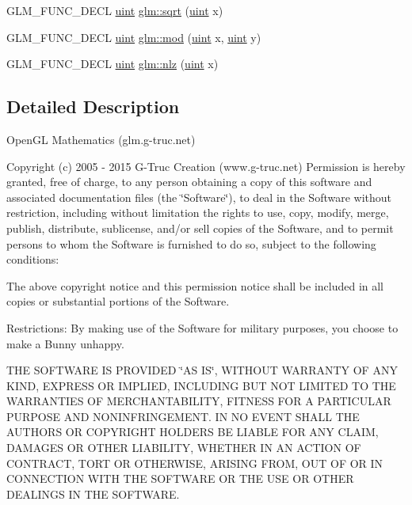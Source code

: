 \begin{DoxyCompactItemize}
\item 
G\+L\+M\+\_\+\+F\+U\+N\+C\+\_\+\+D\+E\+C\+L \hyperlink{stb__image_8c_a91ad9478d81a7aaf2593e8d9c3d06a14}{uint} \hyperlink{group__gtx__integer_ga457e9efca8339bf918d319e9c55f7c8f}{glm\+::sqrt} (\hyperlink{stb__image_8c_a91ad9478d81a7aaf2593e8d9c3d06a14}{uint} x)
\item 
G\+L\+M\+\_\+\+F\+U\+N\+C\+\_\+\+D\+E\+C\+L \hyperlink{stb__image_8c_a91ad9478d81a7aaf2593e8d9c3d06a14}{uint} \hyperlink{group__gtx__integer_gab8f9ec0ca93ca90669434224818f0750}{glm\+::mod} (\hyperlink{stb__image_8c_a91ad9478d81a7aaf2593e8d9c3d06a14}{uint} x, \hyperlink{stb__image_8c_a91ad9478d81a7aaf2593e8d9c3d06a14}{uint} y)
\item 
G\+L\+M\+\_\+\+F\+U\+N\+C\+\_\+\+D\+E\+C\+L \hyperlink{stb__image_8c_a91ad9478d81a7aaf2593e8d9c3d06a14}{uint} \hyperlink{group__gtx__integer_gacbe62fd2384464c16ea30ecc4defc11c}{glm\+::nlz} (\hyperlink{stb__image_8c_a91ad9478d81a7aaf2593e8d9c3d06a14}{uint} x)
\end{DoxyCompactItemize}


\subsection{Detailed Description}
Open\+G\+L Mathematics (glm.\+g-\/truc.\+net)

Copyright (c) 2005 -\/ 2015 G-\/\+Truc Creation (www.\+g-\/truc.\+net) Permission is hereby granted, free of charge, to any person obtaining a copy of this software and associated documentation files (the \char`\"{}\+Software\char`\"{}), to deal in the Software without restriction, including without limitation the rights to use, copy, modify, merge, publish, distribute, sublicense, and/or sell copies of the Software, and to permit persons to whom the Software is furnished to do so, subject to the following conditions\+:

The above copyright notice and this permission notice shall be included in all copies or substantial portions of the Software.

Restrictions\+: By making use of the Software for military purposes, you choose to make a Bunny unhappy.

T\+H\+E S\+O\+F\+T\+W\+A\+R\+E I\+S P\+R\+O\+V\+I\+D\+E\+D \char`\"{}\+A\+S I\+S\char`\"{}, W\+I\+T\+H\+O\+U\+T W\+A\+R\+R\+A\+N\+T\+Y O\+F A\+N\+Y K\+I\+N\+D, E\+X\+P\+R\+E\+S\+S O\+R I\+M\+P\+L\+I\+E\+D, I\+N\+C\+L\+U\+D\+I\+N\+G B\+U\+T N\+O\+T L\+I\+M\+I\+T\+E\+D T\+O T\+H\+E W\+A\+R\+R\+A\+N\+T\+I\+E\+S O\+F M\+E\+R\+C\+H\+A\+N\+T\+A\+B\+I\+L\+I\+T\+Y, F\+I\+T\+N\+E\+S\+S F\+O\+R A P\+A\+R\+T\+I\+C\+U\+L\+A\+R P\+U\+R\+P\+O\+S\+E A\+N\+D N\+O\+N\+I\+N\+F\+R\+I\+N\+G\+E\+M\+E\+N\+T. I\+N N\+O E\+V\+E\+N\+T S\+H\+A\+L\+L T\+H\+E A\+U\+T\+H\+O\+R\+S O\+R C\+O\+P\+Y\+R\+I\+G\+H\+T H\+O\+L\+D\+E\+R\+S B\+E L\+I\+A\+B\+L\+E F\+O\+R A\+N\+Y C\+L\+A\+I\+M, D\+A\+M\+A\+G\+E\+S O\+R O\+T\+H\+E\+R L\+I\+A\+B\+I\+L\+I\+T\+Y, W\+H\+E\+T\+H\+E\+R I\+N A\+N A\+C\+T\+I\+O\+N O\+F C\+O\+N\+T\+R\+A\+C\+T, T\+O\+R\+T O\+R O\+T\+H\+E\+R\+W\+I\+S\+E, A\+R\+I\+S\+I\+N\+G F\+R\+O\+M, O\+U\+T O\+F O\+R I\+N C\+O\+N\+N\+E\+C\+T\+I\+O\+N W\+I\+T\+H T\+H\+E S\+O\+F\+T\+W\+A\+R\+E O\+R T\+H\+E U\+S\+E O\+R O\+T\+H\+E\+R D\+E\+A\+L\+I\+N\+G\+S I\+N T\+H\+E S\+O\+F\+T\+W\+A\+R\+E.


